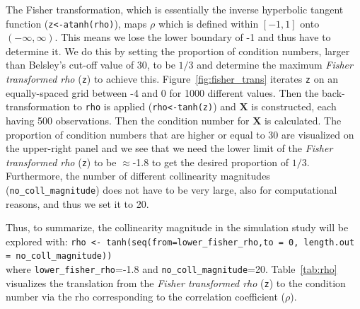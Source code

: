 \documentclass[11pt,a4paper,twoside]{book}\usepackage[]{graphicx}\usepackage[]{xcolor}
\begin{document}
The Fisher transformation, which is essentially the inverse hyperbolic tangent function (\texttt{z<-atanh(rho)}), maps $\rho$ which is defined within $[-1,1]$ onto $(-\infty, \infty)$. This means we lose the lower boundary of -1 and thus have to determine it. We do this by setting the proportion of condition numbers, larger than Belsley's cut-off value of 30, to be $1/3$ and determine the maximum \textit{Fisher transformed rho} (\texttt{z}) to achieve this. Figure~\ref{fig:fisher_trans} iterates \texttt{z} on an equally-spaced grid between -4 and 0 for 1000 different values. Then the back-transformation to \texttt{rho} is applied (\texttt{rho<-tanh(z)}) and $\boldsymbol{X}$ is constructed, each having 500 observations. Then the condition number for $\boldsymbol{X}$ is calculated.
The proportion of condition numbers that are higher or equal to 30 are visualized on the upper-right panel and we see that we need the lower limit of the \textit{Fisher transformed rho} (\texttt{z}) to be $\approx$-1.8 to get the desired proportion of $1/3$. Furthermore, the number of different collinearity magnitudes (\texttt{no\_coll\_magnitude}) does not have to be very large, also for computational reasons, and thus we set it to 20. 

Thus, to summarize, the collinearity magnitude in the simulation study will be explored with:
\texttt{rho <- tanh(seq(from=lower\_fisher\_rho,to = 0, length.out = no\_coll\_magnitude))}\\
where \texttt{lower\_fisher\_rho}=-1.8 and \texttt{no\_coll\_magnitude}=20.
Table~\ref{tab:rho} visualizes the translation from the \textit{Fisher transformed rho} (\texttt{z}) to the condition number via the rho corresponding to the correlation coefficient ($\rho$).
\end{document}
